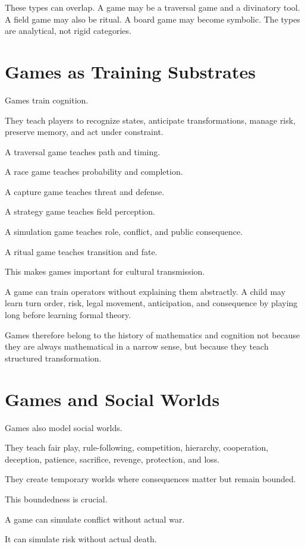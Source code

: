\documentclass[11pt]{book}
\begin{document}
These types can overlap. A game may be a traversal game and a divinatory tool. A field game may also be ritual. A board game may become symbolic. The types are analytical, not rigid categories.

\section{Games as Training Substrates}

Games train cognition.

They teach players to recognize states, anticipate transformations, manage risk, preserve memory, and act under constraint.

A traversal game teaches path and timing.

A race game teaches probability and completion.

A capture game teaches threat and defense.

A strategy game teaches field perception.

A simulation game teaches role, conflict, and public consequence.

A ritual game teaches transition and fate.

This makes games important for cultural transmission.

A game can train operators without explaining them abstractly. A child may learn turn order, risk, legal movement, anticipation, and consequence by playing long before learning formal theory.

Games therefore belong to the history of mathematics and cognition not because they are always mathematical in a narrow sense, but because they teach structured transformation.

\section{Games and Social Worlds}

Games also model social worlds.

They teach fair play, rule-following, competition, hierarchy, cooperation, deception, patience, sacrifice, revenge, protection, and loss.

They create temporary worlds where consequences matter but remain bounded.

This boundedness is crucial.

A game can simulate conflict without actual war.

It can simulate risk without actual death.
\end{document}
